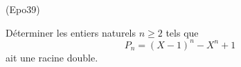 \begin{tiny}(Epo39)\end{tiny} Déterminer les entiers naturels $n\geq2$ tels que
\[
 P_n = (X-1)^n - X^n + 1
\]
ait une racine double.